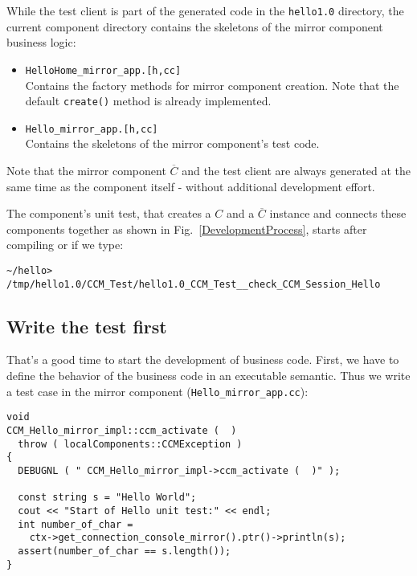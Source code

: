 While the test client is part of the generated code in the {\tt hello1.0}
directory, the current component directory contains the skeletons of the mirror
component business logic:
\begin{itemize}
\item {\tt HelloHome\_mirror\_app.[h,cc]} \\
Contains the factory methods for mirror component creation. Note that the
default {\tt create()} method is already implemented.
\item {\tt Hello\_mirror\_app.[h,cc]} \\
Contains the skeletons of the mirror component's test code.
\end{itemize}

\noindent
Note that the mirror component $\overline{C}$ and the test client are always
generated at the same time as the component itself - without additional
development effort.

\noindent
The component's unit test, that creates a $C$ and a $\overline{C}$ instance and
connects these components together as shown in Fig.~\ref{DevelopmentProcess},
starts after compiling or if we type:
\begin{small}
\begin{verbatim}
~/hello> /tmp/hello1.0/CCM_Test/hello1.0_CCM_Test__check_CCM_Session_Hello
\end{verbatim}
\end{small} 



\subsection{Write the test first}

That's a good time to start the development of business code. First, we have to
define the behavior of the business code in an executable semantic. Thus we
write a test case in the mirror component ({\tt Hello\_mirror\_app.cc}):
\begin{verbatim}
void
CCM_Hello_mirror_impl::ccm_activate (  )
  throw ( localComponents::CCMException )
{
  DEBUGNL ( " CCM_Hello_mirror_impl->ccm_activate (  )" );

  const string s = "Hello World";
  cout << "Start of Hello unit test:" << endl;
  int number_of_char =
    ctx->get_connection_console_mirror().ptr()->println(s);
  assert(number_of_char == s.length());	
}
\end{verbatim}

